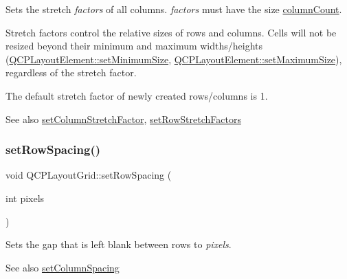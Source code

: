 Sets the stretch {\itshape factors} of all columns. {\itshape factors} must have the size \mbox{\hyperlink{class_q_c_p_layout_grid_a1a2962cbf45011405b64b913afa8e7a2}{column\+Count}}.

Stretch factors control the relative sizes of rows and columns. Cells will not be resized beyond their minimum and maximum widths/heights (\mbox{\hyperlink{class_q_c_p_layout_element_a5dd29a3c8bc88440c97c06b67be7886b}{Q\+C\+P\+Layout\+Element\+::set\+Minimum\+Size}}, \mbox{\hyperlink{class_q_c_p_layout_element_a74eb5280a737ab44833d506db65efd95}{Q\+C\+P\+Layout\+Element\+::set\+Maximum\+Size}}), regardless of the stretch factor.

The default stretch factor of newly created rows/columns is 1.

\begin{DoxySeeAlso}{See also}
\mbox{\hyperlink{class_q_c_p_layout_grid_ae38f31a71687b9d7ee3104852528fb50}{set\+Column\+Stretch\+Factor}}, \mbox{\hyperlink{class_q_c_p_layout_grid_a200b45f9c908f96ebadaa3c8d87a2782}{set\+Row\+Stretch\+Factors}} 
\end{DoxySeeAlso}
\mbox{\label{class_q_c_p_layout_grid_aaef2cd2d456197ee06a208793678e436}} 
\subsubsection{\texorpdfstring{set\+Row\+Spacing()}{setRowSpacing()}}
{\footnotesize\ttfamily void Q\+C\+P\+Layout\+Grid\+::set\+Row\+Spacing (\begin{DoxyParamCaption}\item[{int}]{pixels }\end{DoxyParamCaption})}

Sets the gap that is left blank between rows to {\itshape pixels}.

\begin{DoxySeeAlso}{See also}
\mbox{\hyperlink{class_q_c_p_layout_grid_a3a49272aba32bb0fddc3bb2a45a3dba0}{set\+Column\+Spacing}} 
\end{DoxySeeAlso}
\mbox{\label{class_q_c_p_layout_grid_a7b0273de5369bd93d942edbaf5b166ec}} 
